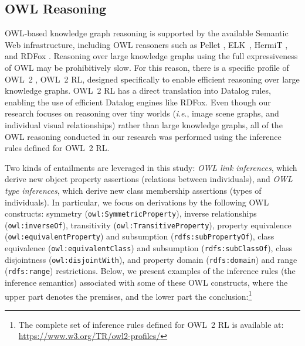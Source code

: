 \documentclass[]{jair}
\newcommand{\ie}{\textit{i}.\textit{e}.,\xspace}
\begin{document}
\subsection{OWL Reasoning}
OWL-based knowledge graph reasoning is supported by the available Semantic Web infrastructure, including OWL reasoners such as Pellet \cite{DBLP:journals/ws/SirinPGKK07}, ELK~\cite{KKS11:unchainel}, HermiT \cite{DBLP:journals/jar/GlimmHMSW14}, and RDFox \cite{DBLP:conf/semweb/NenovPMHWB15}.
Reasoning over large knowledge graphs using the full expressiveness of OWL may be prohibitively slow. 
For this reason, there is a specific profile of OWL~2 \cite{DBLP:conf/rweb/Krotzsch12}, OWL~2 RL, designed specifically to enable efficient reasoning over large knowledge graphs. OWL~2 RL has a direct translation into Datalog rules, enabling the use of efficient Datalog engines like RDFox.
Even though our research focuses on reasoning over tiny worlds (\ie image scene graphs, and individual visual relationships) rather than large knowledge graphs, all of the OWL reasoning conducted in our research was performed using the inference rules defined for OWL~2 RL.

Two kinds of entailments are leveraged in this study: \emph{OWL link inferences}, which derive new object property assertions (relations between individuals), and \emph{OWL type inferences}, which derive new class membership assertions (types of individuals). 
In particular, we focus on derivations by the following OWL constructs: symmetry (\texttt{owl:SymmetricProperty}), inverse relationships (\texttt{owl:inverseOf}), transitivity (\texttt{owl:TransitiveProperty}), property equivalence (\texttt{owl:equivalentProperty}) and subsumption (\texttt{rdfs:subPropertyOf}), class equivalence (\texttt{owl:equivalentClass}) and subsumption (\texttt{rdfs:subClassOf}), class disjointness (\texttt{owl:disjointWith}), and property domain (\texttt{rdfs:domain}) and range (\texttt{rdfs:range}) restrictions.
Below, we present examples of the inference rules (the inference semantics) associated with some of these OWL constructs, where the upper part denotes the premises, and the lower part the conclusion:\footnote{The complete set of inference rules defined for OWL~2 RL is available at: \url{https://www.w3.org/TR/owl2-profiles/}}
\end{document}

